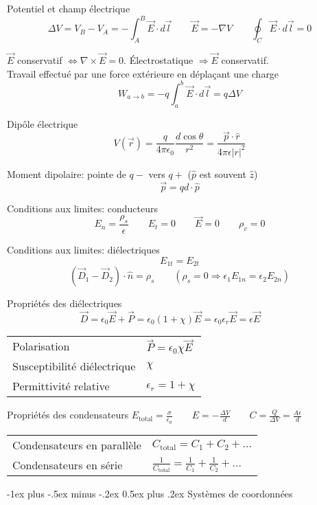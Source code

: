 \documentclass[10pt,landscape]{article}
\makeatletter
\renewcommand{\section}{\@startsection{section}{1}{0mm}%
                                {-1ex plus -.5ex minus -.2ex}%
                                {0.5ex plus .2ex}%
                                {\normalfont\large\bfseries}}
\newcommand{\extraline}{\vspace{1em}}
\makeatother
\begin{document}
\begin{multicols}{3}
Potentiel et champ électrique
\[ \Delta V = V_B - V_A  = -\int_A^B \vec{E}\cdot d\vec{l} \qquad \vec{E} = -\nabla V 
 \qquad \oint_C \vec{E}\cdot d\vec{l}  = 0 \]

$\vec{E}$ conservatif $\Leftrightarrow \nabla \times \vec{E} = 0$.
Électrostatique $\Rightarrow \vec{E}$ conservatif.\\ 

\extraline
Travail effectué par une force extérieure en déplaçant une charge
\[ W_{a\rightarrow b} = -q\int_{a}^{b} \vec{E}\cdot d\vec{l} = q\Delta V \]

Dipôle électrique
\[ V(\vec{r}) = \frac{q}{4\pi\epsilon_0} \frac{d\cos\theta}{r^2} = \frac{\vec{p}\cdot\hat{r}}{4\pi\epsilon|r|^2} \]

Moment dipolaire: pointe de $q-$ vers $q+$ ($\hat{p}$ est souvent $\hat{z}$)
\[ \vec{p} = qd\cdot \hat{p} \]

Conditions aux limites: conducteurs
\[ E_n = \frac{\rho_s}{\epsilon} \qquad E_t = 0 \qquad \vec{E} = 0 \qquad \rho_v = 0 \]

Conditions aux limites: diélectriques
\[ E_{1t} = E_{2t}  \]
\[ (\vec{D}_1 - \vec{D}_2) \cdot \hat{n} = \rho_s  \qquad (\rho_s=0 \Rightarrow \epsilon_1 E_{1n} = \epsilon_2 E_{2n}) \] 

\extraline
Propriétés des diélectriques
\[ \vec{D} = \epsilon_0\vec{E} + \vec{P} = \epsilon_0(1+\chi)\vec{E} = \epsilon_0\epsilon_r\vec{E} = \epsilon\vec{E}
\qquad   \]
\begin{tabular}{@{}ll@{}}
	Polarisation  & $\vec{P} = \epsilon_0\chi\vec{E}$ \\
	Susceptibilité diélectrique  & $\chi$ \\
	Permittivité relative &  $\epsilon_r=1+\chi$
\end{tabular}

\extraline
Propriétés des condensateurs 
$ E_\text{total} = \frac{\sigma}{\epsilon_0} \qquad E = -\frac{\Delta V}{d} 
\qquad C = \frac{Q}{\Delta V} = \frac{A\epsilon}{d} $

\begin{tabular}{@{}ll@{}}
	Condensateurs en parallèle  & $C_\text{total} = C_1 + C_2 + \dots$ \\
	Condensateurs en série & $\frac{1}{C_\text{total}} = \frac{1}{C_1} + \frac{1}{C_2} + \dots $
\end{tabular}

\extraline
\hrulefill



\section{Systèmes de coordonnées}


\end{multicols}
\end{document}
